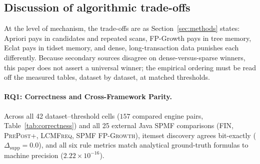 \documentclass[journal,a4paper]{IEEEtran}
\begin{document}
\subsection{Discussion of algorithmic trade-offs}
At the level of mechanism, the trade-offs are as Section~\ref{sec:methods}
states: Apriori pays in candidates and repeated scans, FP-Growth pays
in tree memory, Eclat pays in tidset memory, and dense, long-transaction
data punishes each differently. Because secondary sources disagree on
dense-versus-sparse winners, this paper does not assert a universal
winner; the empirical ordering must be read off the measured tables,
dataset by dataset, at matched thresholds.

\paragraph{RQ1: Correctness and Cross-Framework Parity.} Across all 42
dataset--threshold cells ($157$ compared engine pairs, Table~\ref{tab:correctness})
and all 25 external Java SPMF comparisons (\textsc{FIN}, \textsc{PrePost+},
\textsc{LCMFreq}, SPMF \textsc{FP-Growth}), itemset discovery agrees
bit-exactly ($\Delta_{\mathrm{supp}} = 0.0$), and all six rule metrics match
analytical ground-truth formulas to machine precision ($2.22 \times 10^{-16}$).
\end{document}
